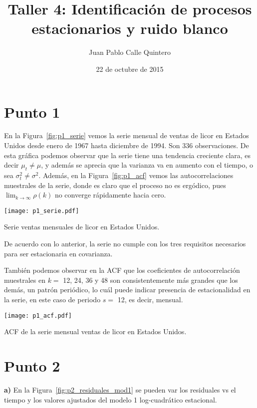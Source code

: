 \documentclass{tufte-handout}
\title{Taller 4: Identificación de procesos estacionarios y ruido blanco}
\author{Juan Pablo Calle Quintero}
\date{22 de octubre de 2015}
\begin{document}
\maketitle

\section*{Punto 1}

En la Figura~\ref{fig:p1_serie} vemos la serie mensual de ventas de licor en Estados Unidos desde enero de 1967 hasta diciembre de 1994. Son 336 observaciones. De esta gráfica podemos observar que la serie tiene una tendencia creciente clara, es decir $\mu_t \neq \mu$, y además se aprecia que la varianza va en aumento con el tiempo, o sea $\sigma_t^2 \neq \sigma^2$. Además, en la Figura~\ref{fig:p1_acf} vemos las autocorrelaciones muestrales de la serie, donde es claro que el proceso no es ergódico, pues $\lim_{k\to\infty} \rho(k)$ no converge rápidamente hacia cero.

\begin{marginfigure}
	\texttt{[image: p1\_serie.pdf]}
	\caption{Serie ventas mensuales de licor en Estados Unidos.}
	\label{fig:p1_serie}
\end{marginfigure}

De acuerdo con lo anterior, la serie no cumple con los tres requisitos necesarios para ser estacionaria en covarianza.

También podemos observar en la ACF que los coeficientes de autocorrelación muestrales en  $k=$ 12, 24, 36 y 48 son consistentemente más grandes que los demás, un patrón periódico, lo cuál puede indicar presencia de estacionalidad en la serie, en este caso de periodo $s=$ 12, es decir, mensual.

\begin{marginfigure}[2cm]
	\texttt{[image: p1\_acf.pdf]}
	\caption{ACF de la serie mensual ventas de licor en Estados Unidos.}
	\label{fig:p1_acf}
\end{marginfigure}

\section*{Punto 2}

\textbf{a)} En la Figura~\ref{fig:p2_residuales_mod1} se pueden var los residuales vs el tiempo y los valores ajustados del modelo 1 log-cuadrático estacional.
\end{document}

